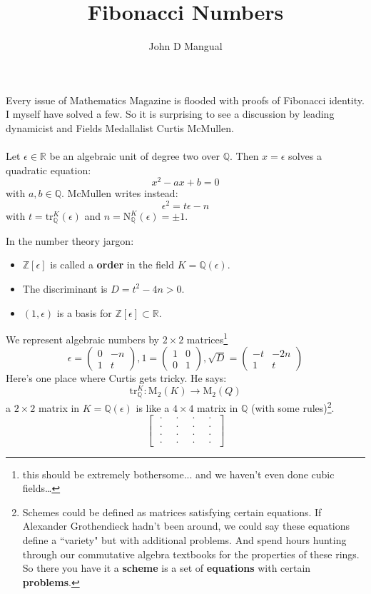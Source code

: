 \documentclass[12pt]{article}
\title{\textbf{ Fibonacci Numbers }}
\author{John D Mangual}
\date{}
\begin{document}
\selectfont \fontsize{25}{30}\selectfont

\maketitle

\noindent Every issue of Mathematics Magazine is flooded with proofs of Fibonacci identity.  I myself have solved a few.  So it is surprising to see a discussion by leading dynamicist and Fields Medallalist Curtis McMullen.  \\ \\
Let $\epsilon \in \mathbb{R}$ be an algebraic unit of degree two over $\mathbb{Q}$.  Then $x = \epsilon$ solves a quadratic equation:
$$ x^2 - ax + b = 0 $$
with $a,b \in \mathbb{Q}$.  McMullen writes instead:
$$ \epsilon^2 = t\epsilon - n $$
with $t = \mathrm{tr}_\mathbb{Q}^K(\epsilon)$ and $n = \mathrm{N}_\mathbb{Q}^K(\epsilon)= \pm 1 $. \newpage

\noindent In the number theory jargon:
\begin{itemize}
\item $\mathbb{Z}[\epsilon]$ is called a \textbf{order} in the field $K = \mathbb{Q}(\epsilon)$.
\item The discriminant is $D = t^2 - 4n > 0$.
\item $(1,\epsilon)$ is a basis for $\mathbb{Z}[\epsilon] \subset \mathbb{R}$.
\end{itemize}
We represent algebraic numbers by $2 \times 2$ matrices\footnote{this should be extremely bothersome... and we haven't even done cubic fields\dots}
$$ \epsilon = \left(
\begin{array}{cr} 
0 & -n \\
1 & t
\end{array}\right), 
 1 = \left(
\begin{array}{cr} 
1 & 0 \\
0 & 1
\end{array}
 \right),
  \sqrt{D} = \left(
\begin{array}{rr} 
-t & -2n \\
1 & t
\end{array}\right)
 $$
Here's one place where Curtis gets tricky.  He says:
$$ \mathrm{tr}_\mathbb{Q}^K: \mathrm{M}_2(K) \to \mathrm{M}_2(Q) $$
a $2 \times 2$ matrix in $K = \mathbb{Q}(\epsilon)$ is like a $4 \times 4$ matrix in $\mathbb{Q}$ (with some rules)\footnote{Schemes could be defined as matrices satisfying certain equations.  If Alexander Grothendieck hadn't been around, we could say these equations define a ``variety" but with additional problems.  And spend hours hunting through our commutative algebra textbooks for the properties of these rings.  So there you have it a \textbf{scheme} is a set of \textbf{equations} with certain \textbf{problems}.}.
$$
\left[
\begin{array}{cc|cc}
\;\cdot \; & \;\cdot \; & \;\cdot \; & \;\cdot \; \\
\;\cdot \; & \;\cdot \; & \;\cdot \; & \;\cdot \; \\ \hline
\;\cdot \; & \;\cdot \; & \;\cdot \; & \;\cdot \; \\
\;\cdot \; & \;\cdot \; & \;\cdot \; & \;\cdot \;  
 \end{array}
 \right]
 $$
\end{document}
